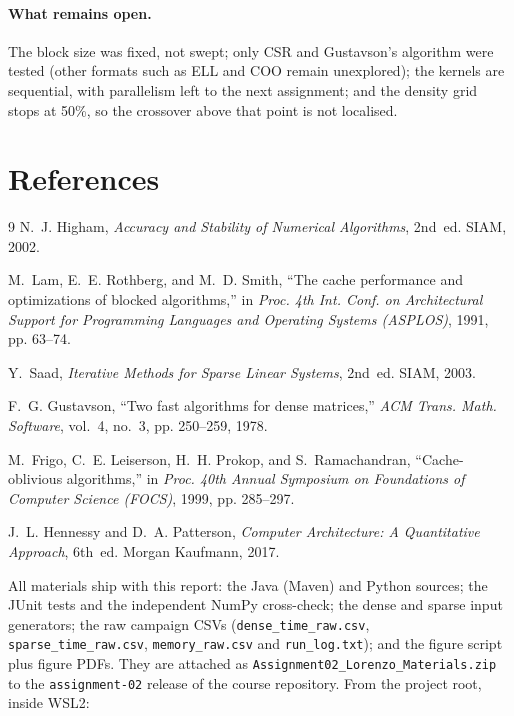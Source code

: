 \documentclass[11pt,a4paper]{article}
\makeatletter
\newcommand{\swallownextsectionstar}{%
  \let\originalsection\section
  \renewcommand{\section}{\@ifnextchar*{\swallowsectionstar}{\originalsection}}}
\def\swallowsectionstar*#1{\let\section\originalsection}
\makeatother
\begin{document}
\paragraph{What remains open.} The block size was fixed, not swept; only CSR
and Gustavson's algorithm were tested (other formats such as ELL and COO
remain unexplored); the kernels are sequential, with parallelism left to the
next assignment; and the density grid stops at 50\%, so the crossover above
that point is not localised.

\clearpage
\section{References}
\swallownextsectionstar
\begin{thebibliography}{9}
    N.~J. Higham, \emph{Accuracy and Stability of Numerical Algorithms},
    2nd~ed. SIAM, 2002.

    M.~Lam, E.~E. Rothberg, and M.~D. Smith, ``The cache performance and
    optimizations of blocked algorithms,'' in \emph{Proc. 4th Int. Conf. on
    Architectural Support for Programming Languages and Operating Systems
    (ASPLOS)}, 1991, pp. 63--74.

    Y.~Saad, \emph{Iterative Methods for Sparse Linear Systems}, 2nd~ed.
    SIAM, 2003.

    F.~G. Gustavson, ``Two fast algorithms for dense matrices,''
    \emph{ACM Trans. Math. Software}, vol.~4, no.~3, pp. 250--259, 1978.

    M.~Frigo, C.~E. Leiserson, H.~H. Prokop, and S.~Ramachandran,
    ``Cache-oblivious algorithms,'' in \emph{Proc. 40th Annual Symposium on
    Foundations of Computer Science (FOCS)}, 1999, pp. 285--297.

    J.~L. Hennessy and D.~A. Patterson, \emph{Computer Architecture: A
    Quantitative Approach}, 6th~ed. Morgan Kaufmann, 2017.
\end{thebibliography}

\section{Reproducibility materials}

All materials ship with this report: the Java (Maven) and Python sources;
the JUnit tests and the independent NumPy cross-check; the dense and sparse
input generators; the raw campaign CSVs (\texttt{dense\_time\_raw.csv},
\texttt{sparse\_time\_raw.csv}, \texttt{memory\_raw.csv} and
\texttt{run\_log.txt}); and the figure script plus figure PDFs. They are
attached as \texttt{Assignment02\_Lorenzo\_Materials.zip} to the
\texttt{assignment-02} release of the course repository. From the project
root, inside WSL2:
\end{document}

